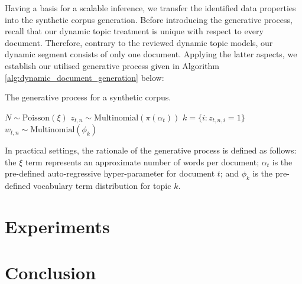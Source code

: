 \documentclass{mpaper}
\begin{document}
\par Having a basis for a scalable inference, we transfer the identified data properties into the synthetic corpus generation. Before introducing the generative process, recall that our dynamic topic treatment is unique with respect to every document. Therefore, contrary to the reviewed dynamic topic models, our dynamic segment consists of only one document. Applying the latter aspects, we establish our utilised generative process given in Algorithm \ref{alg:dynamic_document_generation} below:
\begin{algorithm}[H]
\caption{The generative process for a synthetic corpus.}
\label{alg:dynamic_document_generation}
\begin{algorithmic}[2]
\State $N \sim \mbox{Poisson}(\xi)$
\State $z_{t, n} \sim \mbox{Multinomial}(\pi(\alpha_t))$
\State $k = \{i : z_{t, n, i} = 1\}$
\State $w_{t, n} \sim \mbox{Multinomial}(\phi_k)$
\EndFor
\EndFor
\end{algorithmic}
\end{algorithm}
In practical settings, the rationale of the generative process is defined as follows: the $\xi$ term represents an approximate number of words per document; $\alpha_t$ is the pre-defined auto-regressive hyper-parameter for document $t$; and $\phi_k$ is the pre-defined vocabulary term distribution for topic $k$.


 \section{Experiments}


\lipsum[1-3]

\section{Conclusion}

\lipsum[1]



\end{document}
